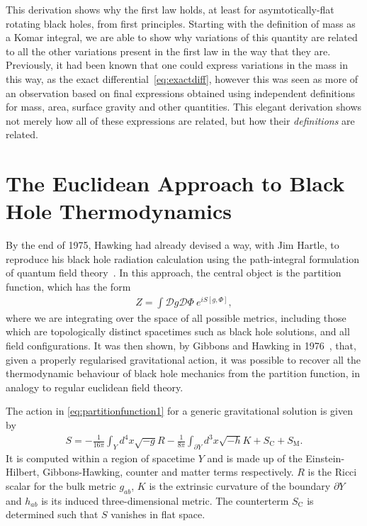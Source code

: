 \documentclass[
twoside,
openright,
frontopenright
]{dmathesis}
\begin{document}
This derivation shows why the first law holds, at least for asymtotically-flat
rotating black holes, from first principles. Starting with the definition of
mass as a Komar integral, we are able to show why variations of this quantity
are related to all the other variations present in the first law in the way that
they are. Previously, it had been known that one could express variations in the
mass in this way, as the exact differential~\eqref{eq:exactdiff}, however this
was seen as more of an observation based on final expressions obtained using
independent definitions for mass, area, surface gravity and other
quantities. This elegant derivation shows not merely how all of these
expressions are related, but how their \emph{definitions} are related.

\section{The Euclidean Approach to Black Hole Thermodynamics}
\label{sec:euclidean}

By the end of 1975, Hawking had already devised a way, with Jim Hartle, to
reproduce his black hole radiation calculation using the path-integral
formulation of quantum field theory~\cite{Hartle:1976tp}. In this approach, the
central object is the partition function, which has the form
\begin{align}
  \label{eq:partitionfunction1}
  Z = \int \mathcal{D}g \mathcal{D} \Phi~e^{iS[g,\Phi]},
\end{align}
where we are integrating over the space of all possible metrics, including those
which are topologically distinct spacetimes such as black hole solutions, and
all field configurations. It was then shown, by Gibbons and Hawking in
1976~\cite{Gibbons:1976ue}, that, given a properly regularised gravitational
action, it was possible to recover all the thermodynamic behaviour of black hole
mechanics from the partition function, in analogy to regular euclidean field
theory.

The action in \cref{eq:partitionfunction1} for a generic gravitational solution
is given by
\begin{align}
  S = -\frac{1}{16\pi}\int_Y d^4x \sqrt{-g} R - \frac{1}{8\pi}\int_{\partial
  Y}d^3x\sqrt{-h}K + S_\mathrm{C} + S_\mathrm{M}.
\end{align}
It is computed within a region of spacetime $Y$ and is made up of the
Einstein-Hilbert, Gibbons-Hawking, counter and matter terms respectively. $R$ is
the Ricci scalar for the bulk metric $g_{ab}$, $K$ is the extrinsic curvature of the
boundary $\partial Y$ and $h_{ab}$ is its induced three-dimensional metric. The
counterterm $S_\mathrm{C}$ is determined such that $S$ vanishes in flat space.
\end{document}
